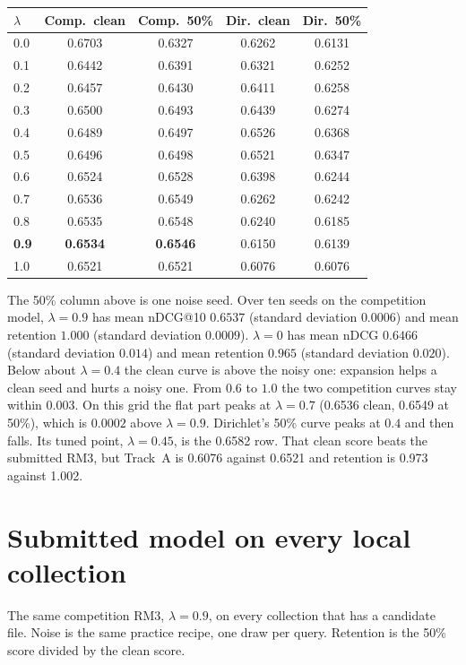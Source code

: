 \documentclass[10pt,a4paper]{article}
\begin{document}
\begin{center}
\small
\begin{tabular}{lcccc}
\toprule
$\lambda$ & Comp.\ clean & Comp.\ 50\% & Dir.\ clean & Dir.\ 50\% \\
\midrule
0.0 & 0.6703 & 0.6327 & 0.6262 & 0.6131 \\
0.1 & 0.6442 & 0.6391 & 0.6321 & 0.6252 \\
0.2 & 0.6457 & 0.6430 & 0.6411 & 0.6258 \\
0.3 & 0.6500 & 0.6493 & 0.6439 & 0.6274 \\
0.4 & 0.6489 & 0.6497 & 0.6526 & 0.6368 \\
0.5 & 0.6496 & 0.6498 & 0.6521 & 0.6347 \\
0.6 & 0.6524 & 0.6528 & 0.6398 & 0.6244 \\
0.7 & 0.6536 & 0.6549 & 0.6262 & 0.6242 \\
0.8 & 0.6535 & 0.6548 & 0.6240 & 0.6185 \\
\textbf{0.9} & \textbf{0.6534} & \textbf{0.6546} & 0.6150 & 0.6139 \\
1.0 & 0.6521 & 0.6521 & 0.6076 & 0.6076 \\
\bottomrule
\end{tabular}
\end{center}

The 50\% column above is one noise seed. Over ten seeds on the competition model, $\lambda{=}0.9$ has mean nDCG@10 $0.6537$ (standard deviation $0.0006$) and mean retention $1.000$ (standard deviation $0.0009$). $\lambda{=}0$ has mean nDCG $0.6466$ (standard deviation $0.014$) and mean retention $0.965$ (standard deviation $0.020$). Below about $\lambda = 0.4$ the clean curve is above the noisy one: expansion helps a clean seed and hurts a noisy one. From $0.6$ to $1.0$ the two competition curves stay within $0.003$. On this grid the flat part peaks at $\lambda{=}0.7$ (0.6536 clean, 0.6549 at 50\%), which is $0.0002$ above $\lambda{=}0.9$. Dirichlet's 50\% curve peaks at $0.4$ and then falls. Its tuned point, $\lambda{=}0.45$, is the 0.6582 row. That clean score beats the submitted RM3, but Track~A is 0.6076 against 0.6521 and retention is 0.973 against 1.002.

\section{Submitted model on every local collection}

The same competition RM3, $\lambda{=}0.9$, on every collection that has a candidate file. Noise is the same practice recipe, one draw per query. Retention is the 50\% score divided by the clean score.
\end{document}

